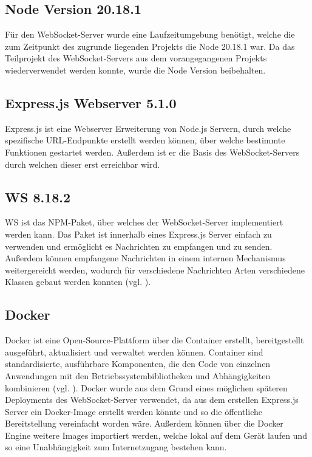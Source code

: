 \subsection{Node Version 20.18.1}
Für den WebSocket-Server wurde eine Laufzeitumgebung benötigt, welche die zum Zeitpunkt des zugrunde liegenden Projekts die Node 20.18.1 war. Da das Teilprojekt des WebSocket-Servers aus dem vorangegangenen Projekts wiederverwendet werden konnte, wurde die Node Version beibehalten.

\subsection{Express.js Webserver 5.1.0}
Express.js ist eine Webserver Erweiterung von Node.js Servern, durch welche spezifische \ac{URL}-Endpunkte erstellt werden können, über welche bestimmte Funktionen gestartet werden. Außerdem ist er die Basis des WebSocket-Servers durch welchen dieser erst erreichbar wird.

\subsection{WS 8.18.2}
WS ist das \ac{NPM}-Paket, über welches der WebSocket-Server implementiert werden kann. Das Paket ist innerhalb eines Express.js Server einfach zu verwenden und ermöglicht es Nachrichten zu empfangen und zu senden. Außerdem können empfangene Nachrichten in einem internen Mechanismus weitergereicht werden, wodurch für verschiedene Nachrichten Arten verschiedene Klassen gebaut werden konnten (vgl. \cite{websockets_websocketsws_2025}).

\subsection{Docker}
Docker ist eine Open-Source-Plattform über die Container erstellt, bereitgestellt ausgeführt, aktualisiert und verwaltet werden können. Container sind standardisierte, ausführbare Komponenten, die den Code von einzelnen Anwendungen mit den Betriebssystembibliotheken und Abhängigkeiten kombinieren (vgl. \cite{noauthor_was_2024}). Docker wurde aus dem Grund eines möglichen späteren Deployments des WebSocket-Server verwendet, da aus dem erstellen Express.js Server ein Docker-Image erstellt werden könnte und so die öffentliche Bereitstellung vereinfacht worden wäre. Außerdem können über die Docker Engine weitere Images importiert werden, welche lokal auf dem Gerät laufen und so eine Unabhängigkeit zum Internetzugang bestehen kann.

